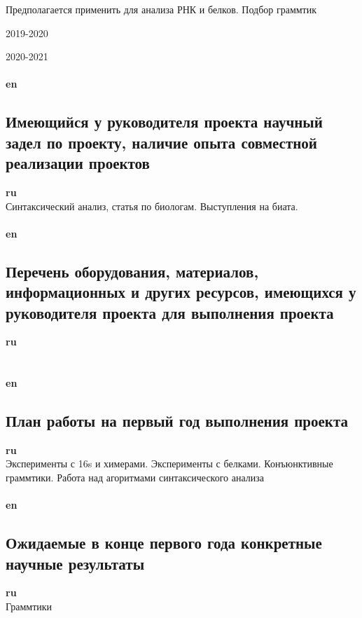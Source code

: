 \documentclass[12pt]{article}  %
\theoremstyle{remark}
\begin{document}
Предполагается применить для анализа РНК и белков.
Подбор граммтик


2019-2020


2020-2021
\\
\\
\textbf{en}\\


\subsection{Имеющийся у руководителя проекта научный задел по проекту, наличие опыта совместной реализации проектов}

\textbf{ru}\\
Синтаксический анализ, статья по биологам. Выступления на биата.
\\
\\
\textbf{en}\\


\subsection{Перечень оборудования, материалов, информационных и других ресурсов, имеющихся у руководителя проекта для выполнения проекта }
\textbf{ru}\\
\\
\\
\textbf{en}\\


\subsection{План работы на первый год выполнения проекта}

\textbf{ru}\\
Эксперименты с 16s и химерами. Эксперименты с белками. Конъюнктивные граммтики. Работа над агоритмами синтаксического анализа
\\
\\
\textbf{en}\\

\subsection{Ожидаемые в конце первого года конкретные научные результаты}

\textbf{ru}\\
Граммтики
\end{document}

